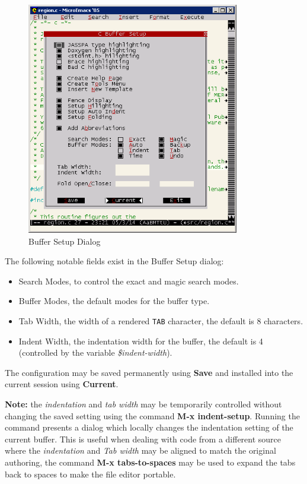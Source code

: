 \documentclass[11pt,a4paper,pdftex]{article}
\begin{document}
\begin{figure}[!hbt]
  \begin{center}
    \includegraphics[keepaspectratio,height=4in]{buffersetup}
    \caption{Buffer Setup Dialog}
    \label{fig:buffersetup}
  \end{center}
\end{figure}
  
  The following notable fields exist in the Buffer Setup dialog:
  
  \begin{itemize}
    \item Search Modes, to control the exact and magic search modes.
    \item Buffer Modes, the default modes for the buffer type.
    \item Tab Width, the width of a rendered \texttt{TAB} character, the 
    default is 8 characters.
    \item Indent Width, the indentation width for the buffer, the default is 4 
    (controlled by the variable \textit{\$indent-width}).
  \end{itemize}
  
  The configuration may be saved permanently using \textbf{Save} and installed
  into the current session using \textbf{Current}.
  
  \textbf{Note:} the \textit{indentation} and \textit{tab width} may be
  temporarily controlled without changing the saved setting using the command
  \textbf{M-x indent-setup}. Running the command presents a dialog which
  locally changes the indentation setting of the current buffer. This is
  useful when dealing with code from a different source where the
  \textit{indentation} and \textit{Tab width} may be aligned to match the
  original authoring, the command \textbf{M-x tabs-to-spaces} may be used to
  expand the tabs back to spaces to make the file editor portable.
\end{document}
